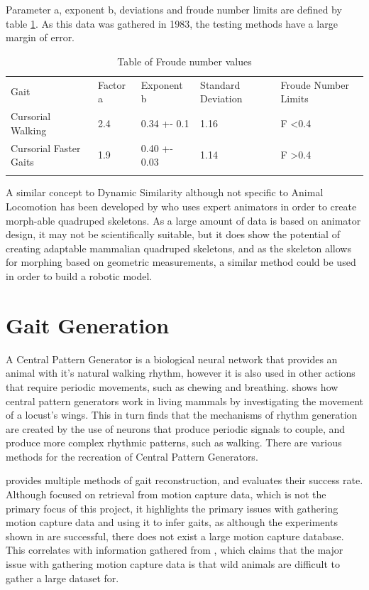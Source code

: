 Parameter a, exponent b, deviations and froude number limits are defined by table \ref{table:froude}. As this data was gathered in 1983, the testing methods have a large margin of error.

\begin{table}[width=15cm]
\begin{tabular}{lllll}
Gait         & Factor a & Exponent b   & Standard Deviation & Froude Number Limits \\
Cursorial Walking      & 2.4      & 0.34 +- 0.1  & 1.16                      & F \textless 0.4       \\
Cursorial Faster Gaits & 1.9      & 0.40 +- 0.03 & 1.14                      & F \textgreater 0.4    \\
                               &          &              &                           &                      
\end{tabular}
\caption{Table of Froude number values}
\label{table:froude}
\end{table}

A similar concept to Dynamic Similarity although not specific to Animal Locomotion has been developed by \citep{Reveret2009} who uses expert animators in order to create morph-able quadruped skeletons. As a large amount of data is based on animator design, it may not be scientifically suitable, but it does show the potential of creating adaptable mammalian quadruped skeletons, and as the skeleton allows for morphing based on geometric measurements, a similar method could be used in order to build a robotic model. 

\section{Gait Generation}

A Central Pattern Generator is a biological neural network that provides an animal with it's natural walking rhythm, however it is also used in other actions that require periodic movements, such as chewing and breathing.  \cite{MarderEveBucher2001} shows how central pattern generators work in living mammals by investigating the movement of a locust's wings. This in turn finds that the mechanisms of rhythm generation are created by the use of neurons that produce periodic signals to couple, and produce more complex rhythmic patterns, such as walking. There are various methods for the recreation of Central Pattern Generators. 

\citep{Kruger2014} provides multiple methods of gait reconstruction, and evaluates their success rate. Although focused on retrieval from motion capture data, which is not the primary focus of this project, it highlights the primary issues with gathering motion capture data and using it to infer gaits, as although the experiments shown in \cite{Kruger2014} are successful, there does not exist a large motion capture database. This correlates with information gathered from \cite{Skrba2010}, which claims that the major issue with gathering motion capture data is that wild animals are difficult to gather a large dataset for.

